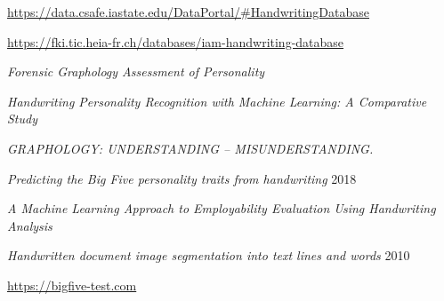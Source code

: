 \documentclass[10pt, a4paper]{article}
\begin{document}
\begin{thebibliography}{99}
         \url{https://data.csafe.iastate.edu/DataPortal/#HandwritingDatabase} 
        
         \url{https://fki.tic.heia-fr.ch/databases/iam-handwriting-database} 

         \emph{Forensic Graphology Assessment of Personality}

         \emph{Handwriting Personality Recognition with Machine  Learning: A Comparative Study}

         \emph{GRAPHOLOGY: UNDERSTANDING – MISUNDERSTANDING.}

         \emph{Predicting the Big Five personality traits from handwriting } 2018

         \emph{A Machine Learning Approach to Employability Evaluation Using Handwriting Analysis}

         \emph{Handwritten document image segmentation into text lines and words} 2010
        
         \url{https://bigfive-test.com}
    \end{thebibliography}
\end{document}
